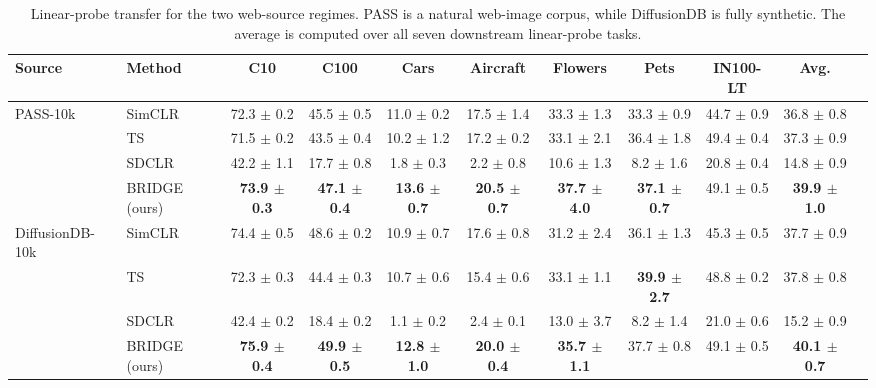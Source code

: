 \begin{table}[t]
\centering
\tiny
\setlength{\tabcolsep}{3.0pt}
\caption{Linear-probe transfer for the two web-source regimes. PASS is a natural web-image corpus, while DiffusionDB is fully synthetic. The average is computed over all seven downstream linear-probe tasks.}
\label{tab:main_sota_web_sources}
\begin{adjustbox}{max width=\textwidth}
\begin{tabular}{l l c c c c c c c c c}
\toprule
Source & Method & C10 & C100 & Cars & Aircraft & Flowers & Pets & IN100-LT & Avg. \\
\midrule
PASS-10k & SimCLR & 72.3 {\scriptsize$\pm$ 0.2} & 45.5 {\scriptsize$\pm$ 0.5} & 11.0 {\scriptsize$\pm$ 0.2} & 17.5 {\scriptsize$\pm$ 1.4} & 33.3 {\scriptsize$\pm$ 1.3} & 33.3 {\scriptsize$\pm$ 0.9} & 44.7 {\scriptsize$\pm$ 0.9} & 36.8 {\scriptsize$\pm$ 0.8} \\
 & TS & 71.5 {\scriptsize$\pm$ 0.2} & 43.5 {\scriptsize$\pm$ 0.4} & 10.2 {\scriptsize$\pm$ 1.2} & 17.2 {\scriptsize$\pm$ 0.2} & 33.1 {\scriptsize$\pm$ 2.1} & 36.4 {\scriptsize$\pm$ 1.8} & 49.4 {\scriptsize$\pm$ 0.4} & 37.3 {\scriptsize$\pm$ 0.9} \\
 & SDCLR & 42.2 {\scriptsize$\pm$ 1.1} & 17.7 {\scriptsize$\pm$ 0.8} & 1.8 {\scriptsize$\pm$ 0.3} & 2.2 {\scriptsize$\pm$ 0.8} & 10.6 {\scriptsize$\pm$ 1.3} & 8.2 {\scriptsize$\pm$ 1.6} & 20.8 {\scriptsize$\pm$ 0.4} & 14.8 {\scriptsize$\pm$ 0.9} \\
\rowcolor{blue!10}  & BRIDGE (ours) & \textbf{73.9 {\scriptsize$\pm$ 0.3}} & \textbf{47.1 {\scriptsize$\pm$ 0.4}} & \textbf{13.6 {\scriptsize$\pm$ 0.7}} & \textbf{20.5 {\scriptsize$\pm$ 0.7}} & \textbf{37.7 {\scriptsize$\pm$ 4.0}} & \textbf{37.1 {\scriptsize$\pm$ 0.7}} & 49.1 {\scriptsize$\pm$ 0.5} & \textbf{39.9 {\scriptsize$\pm$ 1.0}} \\
\midrule
DiffusionDB-10k & SimCLR & 74.4 {\scriptsize$\pm$ 0.5} & 48.6 {\scriptsize$\pm$ 0.2} & 10.9 {\scriptsize$\pm$ 0.7} & 17.6 {\scriptsize$\pm$ 0.8} & 31.2 {\scriptsize$\pm$ 2.4} & 36.1 {\scriptsize$\pm$ 1.3} & 45.3 {\scriptsize$\pm$ 0.5} & 37.7 {\scriptsize$\pm$ 0.9} \\
 & TS & 72.3 {\scriptsize$\pm$ 0.3} & 44.4 {\scriptsize$\pm$ 0.3} & 10.7 {\scriptsize$\pm$ 0.6} & 15.4 {\scriptsize$\pm$ 0.6} & 33.1 {\scriptsize$\pm$ 1.1} & \textbf{39.9 {\scriptsize$\pm$ 2.7}} & 48.8 {\scriptsize$\pm$ 0.2} & 37.8 {\scriptsize$\pm$ 0.8} \\
 & SDCLR & 42.4 {\scriptsize$\pm$ 0.2} & 18.4 {\scriptsize$\pm$ 0.2} & 1.1 {\scriptsize$\pm$ 0.2} & 2.4 {\scriptsize$\pm$ 0.1} & 13.0 {\scriptsize$\pm$ 3.7} & 8.2 {\scriptsize$\pm$ 1.4} & 21.0 {\scriptsize$\pm$ 0.6} & 15.2 {\scriptsize$\pm$ 0.9} \\
\rowcolor{blue!10}  & BRIDGE (ours) & \textbf{75.9 {\scriptsize$\pm$ 0.4}} & \textbf{49.9 {\scriptsize$\pm$ 0.5}} & \textbf{12.8 {\scriptsize$\pm$ 1.0}} & \textbf{20.0 {\scriptsize$\pm$ 0.4}} & \textbf{35.7 {\scriptsize$\pm$ 1.1}} & 37.7 {\scriptsize$\pm$ 0.8} & 49.1 {\scriptsize$\pm$ 0.5} & \textbf{40.1 {\scriptsize$\pm$ 0.7}} \\
\bottomrule
\end{tabular}
\end{adjustbox}
\end{table}
